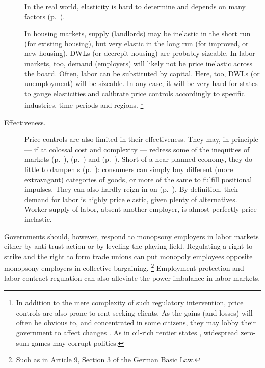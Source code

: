 \begin{description}
	In the real world, \hyperref[sec:well-determined-incidence]{elasticity is hard to determine} and depends on many factors (p.~\pageref{sec:well-determined-incidence}).

	In housing markets, supply (landlords) may be inelastic in the short run (for existing housing), but very elastic in the long run (for improved, or new housing).
	\glspl{DWL} (or decrepit housing) are probably sizeable.
	In labor markets, too, demand (employers) will likely not be price inelastic across the board.
	Often, labor can be substituted by capital.
	Here, too, \glspl{DWL} (or unemployment) will be sizeable.
	In any case, it will be very hard for states to gauge elasticities and calibrate price controls accordingly to specific industries, time periods and regions.
	\footnote{
		In addition to the mere complexity of such regulatory intervention, price controls are also prone to rent-seeking clients.
		As the gains (and losses) will often be obvious to, and concentrated in some citizens, they may lobby their government to affect changes \citep{Peltzman1976,Posner1975,Krueger1974}.
		As in oil-rich rentier states \citep{Beblawi1990}, widespread zero-sum games may corrupt politics.
	}
	\item[Effectiveness.]
	Price controls are also limited in their effectiveness.
They may, in principle --- if at colossal cost and complexity --- redress some of the inequities of  markets (p.~\pageref{sec:winne-take-all}),  (p.~\pageref{sec:different-budget-constraints}) and  (p.~\pageref{sec:diminishing-marginal-utility}).
Short of a near planned economy, they do little to dampen s (p.~\pageref{sec:positional-race}):
 consumers can simply buy different (more extravagant) categories of goods, or more of the same to fulfill positional impulses.
They can also hardly reign in on  (p.~\pageref{sec:monopsony-employers}).
By definition, their demand for labor is highly price elastic, given plenty of alternatives.
Worker supply of labor, absent another employer, is almost perfectly price inelastic.
\end{description}

Governments should, however, respond to monopsony employers in labor markets either by anti-trust action or by leveling the playing field.
Regulating a right to strike and the right to form trade unions can put monopoly employees opposite monopsony employers in collective bargaining.
\footnote{
	Such as in Article 9, Section 3 of the German Basic Law.
}
Employment protection and labor contract regulation can also alleviate the power imbalance in labor markets.

